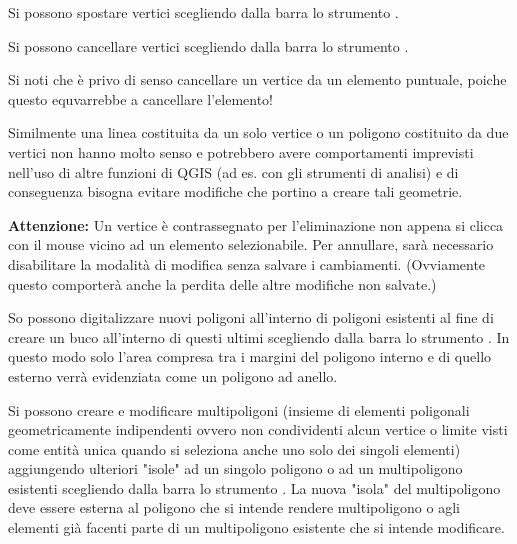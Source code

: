 
Si possono spostare vertici scegliendo dalla barra lo strumento .


Si possono cancellare vertici scegliendo dalla barra lo strumento .

Si noti che è privo di senso cancellare un vertice da un elemento puntuale,
poiche questo equvarrebbe a cancellare l'elemento!

Similmente una linea costituita da un solo vertice o un poligono costituito da
due vertici non hanno molto senso e potrebbero avere comportamenti imprevisti
nell'uso di altre funzioni di QGIS (ad es. con gli strumenti di analisi) e di
conseguenza bisogna evitare modifiche che portino a creare tali geometrie.

\textbf{Attenzione:} Un vertice è contrassegnato per l'eliminazione non appena
si clicca con il mouse vicino ad un elemento selezionabile. Per annullare,
sarà necessario disabilitare la modalità di modifica senza salvare i
cambiamenti. (Ovviamente questo comporterà anche la perdita delle altre
modifiche non salvate.)


So possono digitalizzare nuovi poligoni all'interno di poligoni esistenti al fine
di creare un buco all'interno di questi ultimi scegliendo dalla barra lo
strumento .
In questo modo solo l'area compresa tra i margini del poligono interno e di
quello esterno verrà evidenziata come un poligono ad anello. 


Si possono creare e modificare multipoligoni (insieme di elementi poligonali
geometricamente indipendenti ovvero non condividenti alcun vertice o limite
visti come entità unica quando si seleziona anche uno solo dei singoli
elementi) aggiungendo ulteriori "isole" ad
un singolo poligono o ad un multipoligono esistenti scegliendo dalla barra lo
strumento . La nuova "isola"
del multipoligono deve essere esterna al poligono che si intende rendere
multipoligono o agli elementi già facenti parte di un multipoligono esistente
che si intende modificare. 


